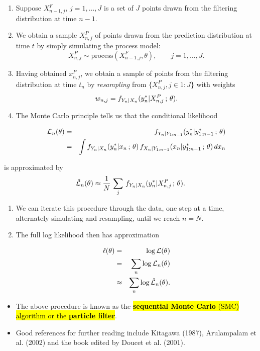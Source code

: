 \documentclass[]{article}
\begin{document}
\begin{enumerate}
\def\labelenumi{\arabic{enumi}.}
\item
  Suppose \(X_{n-1,j}^{F}\), \(j=1,\dots,J\) is a set of \(J\) points
  drawn from the filtering distribution at time \(n-1\).
\item
  We obtain a sample \(X_{n,j}^{P}\) of points drawn from the prediction
  distribution at time \(t\) by simply simulating the process model:
  \[X_{n,j}^{P} \sim \mathrm{process}(X_{n-1,j}^{F},\theta), \qquad j=1,\dots,J.\]
\item
  Having obtained \(x_{n,j}^{P}\), we obtain a sample of points from the
  filtering distribution at time \(t_n\) by \emph{resampling} from
  \(\big\{X_{n,j}^{P},j\in 1:J\big\}\) with weights
  \[w_{n,j}=f_{Y_n|X_n}(y^*_{n}|X^P_{n,j}\, ; \,\theta).\]
\item
  The Monte Carlo principle tells us that the conditional likelihood

  \begin{eqnarray}
  \mathcal{L}_n(\theta) &=& f_{Y_n|Y_{1:n-1}}(y^*_n|y^*_{1:n-1}\, ; \,\theta)
  \\
  &=& 
  \int
  f_{Y_n|X_n}(y^*_{n}|x_{n}\, ; \,\theta)\,f_{X_n|Y_{1:n-1}}(x_{n}|y^*_{1:n-1}\, ; \,\theta)\, dx_n
  \end{eqnarray}
\end{enumerate}

is approximated by
\[\hat{\mathcal{L}}_n(\theta)  \approx \frac{1}{N}\,\sum_j\, f_{Y_n|X_n}(y^*_{n}|X_{n,j}^{P}\, ; \,\theta).\]

\begin{enumerate}
\def\labelenumi{\arabic{enumi}.}
\setcounter{enumi}{4}
\item
  We can iterate this procedure through the data, one step at a time,
  alternately simulating and resampling, until we reach \(n=N\).
\item
  The full log likelihood then has approximation

  \begin{eqnarray}\ell(\theta) 
  &=& \log{\mathcal{L}(\theta)} 
  \\
  &=& \sum_n \log{\mathcal{L}_n(\theta)}
  \\
  &\approx& \sum_n\log\hat{\mathcal{L}}_n(\theta).
  \end{eqnarray}
\end{enumerate}

\begin{itemize}
\item
  The above procedure is known as the \hl{\textbf{sequential Monte Carlo}
  (SMC) algorithm or the \textbf{particle filter}}.
\item
  Good references for further reading include Kitagawa (1987),
  Arulampalam et al. (2002) and the book edited by Doucet et al. (2001).
  
\end{itemize}
\end{document}
